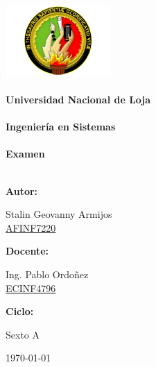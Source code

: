 \documentclass{report}
\begin{document}


\newcommand{\titulo}{ Universidad Nacional de Loja \\ \ \\ Ingeniería en Sistemas \\ \ \\ Examen\\ \ \\}
\newcommand{\fecha}{\today}




\pagestyle{empty}


\begin{center}\includegraphics[height=3cm, width=4cm]{unl}\end{center}


\Huge\bf\titulo
\raggedright\bf{Autor:}
\begin{center}
\rm Stalin Geovanny Armijos\\
\href{http://www.iralis.org/?q=node%2F10&paso=10&letra=&id=7220}{AFINF7220}
\end{center}

\raggedright\textbf{Docente:\\}
\begin{center}
\rm Ing. Pablo Ordoñez\\
\href{http://www.iralis.org/?q=node%2F10&paso=10&letra=O&id=4796}{ECINF4796}
\end{center} 

\raggedright\bf{Ciclo:}
\begin{center}
\rm Sexto A
\end{center}

\begin{center}


\huge\rm\fecha
\end{center}
\end{document}
